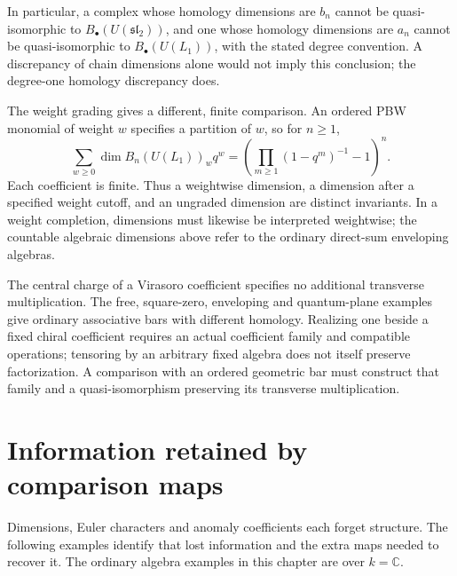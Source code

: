 In particular, a complex whose homology dimensions are $b_n$ cannot be
quasi-isomorphic to $B_\bullet(U(\mathfrak{sl}_2))$, and one whose homology
dimensions are $a_n$ cannot be quasi-isomorphic to $B_\bullet(U(L_1))$,
with the stated degree convention.  A discrepancy of chain dimensions
alone would not imply this conclusion; the degree-one homology discrepancy
does.

The weight grading gives a different, finite comparison.  An ordered PBW
monomial of weight $w$ specifies a partition of $w$, so for $n\ge1$,
\[
 \sum_{w\ge0}\dim B_n(U(L_1))_w q^w
 =\left(\prod_{m\ge1}(1-q^m)^{-1}-1\right)^n.
\]
Each coefficient is finite.  Thus a weightwise dimension, a dimension
after a specified weight cutoff, and an ungraded dimension are distinct
invariants.  In a weight completion, dimensions must likewise be interpreted
weightwise; the countable algebraic dimensions above refer to the ordinary
direct-sum enveloping algebras.

\begin{remark}
The central charge of a Virasoro coefficient specifies no additional
transverse multiplication. The free, square-zero, enveloping and quantum-plane
examples give ordinary associative bars with different homology.
Realizing one beside a fixed chiral coefficient requires an actual coefficient
family and compatible operations; tensoring by an arbitrary fixed algebra
does not itself preserve factorization.
A comparison with an ordered geometric bar must construct that family and
a quasi-isomorphism preserving its transverse multiplication.
\end{remark}

\chapter{Information retained by comparison maps}
\label{ch:obstructions}

Dimensions, Euler characters and anomaly coefficients each forget structure.
The following examples identify that lost information and the extra maps
needed to recover it.
The ordinary algebra examples in this chapter are over $k=\mathbb C$.

